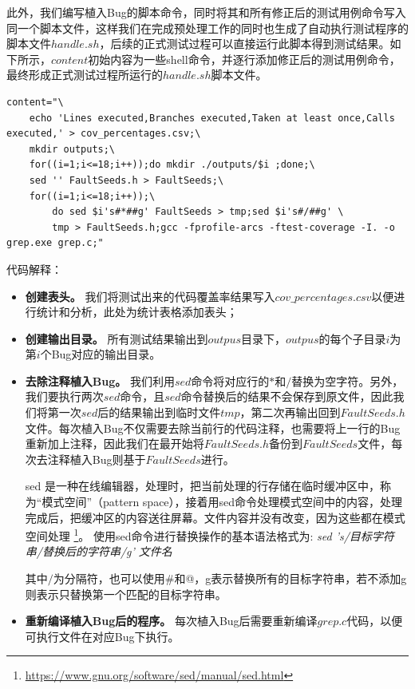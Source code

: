 \documentclass[12pt, a4paper, oneside,bibend=bibtex]{ctexart}
\begin{document}
此外，我们编写植入Bug的脚本命令，同时将其和所有修正后的测试用例命令写入同一个脚本文件，这样我们在完成预处理工作的同时也生成了自动执行测试程序的脚本文件$handle.sh$，后续的正式测试过程可以直接运行此脚本得到测试结果。如下所示，$content$初始内容为一些shell命令，并逐行添加修正后的测试用例命令，最终形成正式测试过程所运行的$handle.sh$脚本文件。
\begin{lstlisting}[caption={handle.sh pt.1}]
content="\
    echo 'Lines executed,Branches executed,Taken at least once,Calls executed,' > cov_percentages.csv;\
    mkdir outputs;\
    for((i=1;i<=18;i++));do mkdir ./outputs/$i ;done;\
    sed '' FaultSeeds.h > FaultSeeds;\
    for((i=1;i<=18;i++));\
        do sed $i's#*##g' FaultSeeds > tmp;sed $i's#/##g' \
        tmp > FaultSeeds.h;gcc -fprofile-arcs -ftest-coverage -I. -o grep.exe grep.c;"
\end{lstlisting}
代码解释：
\begin{itemize}
    \item \textbf{创建表头。} 我们将测试出来的代码覆盖率结果写入$cov\_percentages.csv$以便进行统计和分析，此处为统计表格添加表头；
    \item \textbf{创建输出目录。} 所有测试结果输出到$outpus$目录下，$outpus$的每个子目录$i$为第$i$个Bug对应的输出目录。
    \item \textbf{去除注释植入Bug。} 我们利用$sed$命令将对应行的$*$和$/$替换为空字符。另外，我们要执行两次$sed$命令，且$sed$命令替换后的结果不会保存到原文件，因此我们将第一次$sed$后的结果输出到临时文件$tmp$，第二次再输出回到$FaultSeeds.h$文件。每次植入Bug不仅需要去除当前行的代码注释，也需要将上一行的Bug重新加上注释，因此我们在最开始将$FaultSeeds.h$备份到$FaultSeeds$文件，每次去注释植入Bug则基于$FaultSeeds$进行。
    \begin{myquote}
    sed 是一种在线编辑器，处理时，把当前处理的行存储在临时缓冲区中，称为“模式空间”（pattern space），接着用sed命令处理模式空间中的内容，处理完成后，把缓冲区的内容送往屏幕。文件内容并没有改变，因为这些都在模式空间处理
    \footnote{\url{https://www.gnu.org/software/sed/manual/sed.html}}。
    使用sed命令进行替换操作的基本语法格式为:\quad
    \textit{sed 's/目标字符串/替换后的字符串/g' 文件名}

    其中$/$为分隔符，也可以使用\#和@，g表示替换所有的目标字符串，若不添加g则表示只替换第一个匹配的目标字符串。
    \end{myquote}
    \item \textbf{重新编译植入Bug后的程序。} 每次植入Bug后需要重新编译$grep.c$代码，以便可执行文件在对应Bug下执行。
\end{itemize}
\end{document}
